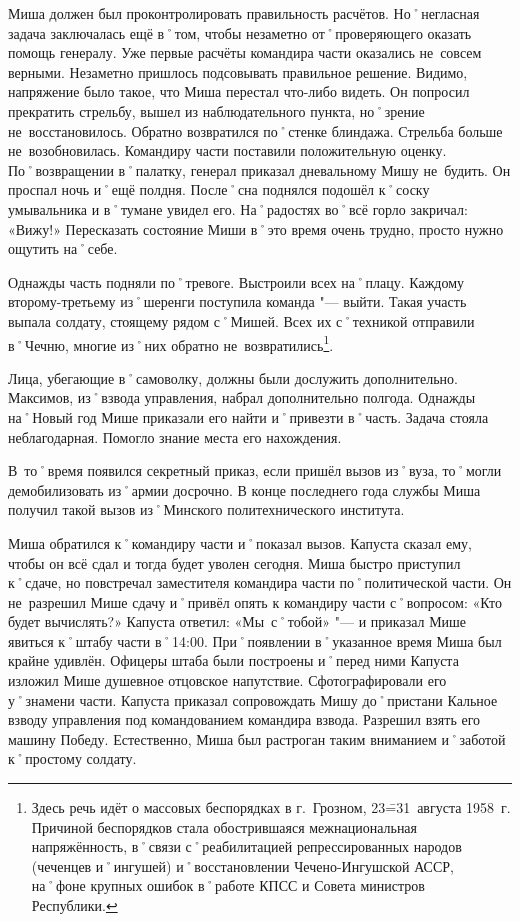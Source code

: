 Миша должен был проконтролировать правильность расчётов. Но˚негласная задача заключалась ещё в˚том, чтобы незаметно от˚проверяющего оказать помощь генералу. Уже первые расчёты командира части оказались не~совсем верными. Незаметно пришлось подсовывать правильное решение. Видимо, напряжение было такое, что Миша перестал что-либо видеть. Он попросил прекратить стрельбу, вышел из наблюдательного пункта, но˚зрение не~восстановилось. Обратно возвратился по˚стенке блиндажа. Стрельба больше не~возобновилась. Командиру части поставили положительную оценку. По˚возвращении в˚палатку, генерал приказал дневальному Мишу не~будить. Он проспал ночь и˚ещё полдня. После˚сна поднялся подошёл к˚соску умывальника и в˚тумане увидел его. На˚радостях во˚всё горло закричал: «Вижу!» Пересказать состояние Миши в˚это время очень трудно, просто нужно ощутить на˚себе.

Однажды часть подняли по˚тревоге. Выстроили всех на˚плацу. Каждому второму\--третьему из˚шеренги поступила команда "--- выйти. Такая участь выпала солдату, стоящему рядом с˚Мишей. Всех их с˚техникой отправили в˚Чечню, многие из˚них обратно не~возвратились\footnote
{Здесь речь идёт о массовых беспорядках в г.~Грозном, 23\==31~августа 1958~г. Причиной беспорядков стала обострившаяся межнациональная напряжённость, в˚связи с˚реабилитацией репрессированных народов (чеченцев и˚ингушей) и˚восстановлении Чечено-Ингушской АССР, на˚фоне крупных ошибок в˚работе КПСС и Совета министров Республики.}. 

Лица, убегающие в˚самоволку, должны были дослужить дополнительно. Максимов, из˚взвода управления, набрал дополнительно полгода. Однажды на˚Новый год Мише приказали его найти и˚привезти в˚часть. Задача стояла неблагодарная. Помогло знание места его нахождения. 

В~то˚время появился секретный приказ, если пришёл вызов из˚вуза, то˚могли демобилизовать из˚армии досрочно. В конце последнего года службы Миша получил такой вызов из˚Минского политехнического института. 

Миша обратился к˚командиру части и˚показал вызов. Капуста сказал ему, чтобы он всё сдал и тогда будет уволен сегодня. Миша быстро приступил к˚сдаче, но повстречал заместителя командира части по˚политической части. Он не~разрешил Мише сдачу и˚привёл опять к командиру части с˚вопросом: «Кто будет вычислять?» Капуста ответил: «Мы~с˚тобой» "--- и приказал Мише явиться к˚штабу части в˚14:00. При˚появлении в˚указанное время Миша был крайне удивлён. Офицеры штаба были построены и˚перед ними Капуста изложил Мише душевное отцовское напутствие. Сфотографировали его у˚знамени части. Капуста приказал сопровождать Мишу до˚пристани Кальное взводу управления под командованием командира взвода. Разрешил взять его машину Победу. Естественно, Миша был растроган таким вниманием и˚заботой к˚простому солдату. 

